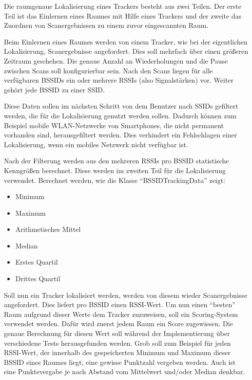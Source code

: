 Die raumgenaue Lokalisierung eines Trackers besteht aus zwei Teilen.
Der erste Teil ist das Einlernen eines Raumes mit Hilfe eines Trackers und der zweite das Zuordnen von Scanergebnissen
zu einem zuvor eingescannten Raum.

Beim Einlernen eines Raumes werden von einem Tracker, wie bei der eigentlichen Lokalisierung, Scanergebnisse angefordert.
Dies soll mehrfach über einen größeren Zeitraum geschehen.
Die genaue Anzahl an Wiederholungen und die Pause zwischen Scans soll konfigurierbar sein.
Nach den Scans liegen für alle verfügbaren \glspl{BSSID} ein oder mehrere \glspl{RSSI} (also Signalstärken) vor.
Weiter gehört jede \gls{BSSID} zu einer \gls{SSID}.

Diese Daten sollen im nächsten Schritt von dem Benutzer nach \glspl{SSID} gefiltert werden, die für die Lokalisierung
genutzt werden sollen.
Dadurch können zum Beispiel mobile \gls{WLAN}-Netzwerke von Smartphones, die nicht permanent vorhanden sind, herausgefiltert werden.
Dies verhindert ein Fehlschlagen einer Lokalisierung, wenn ein mobiles Netzwerk nicht verfügbar ist.

Nach der Filterung werden aus den mehreren \glspl{RSSI} pro \gls{BSSID} statistische Kenngrößen berechnet.
Diese werden im zweiten Teil für die Lokalisierung verwendet.
Berechnet werden, wie die Klasse \enquote{BSSIDTrackingData} zeigt:
\begin{itemize}
	\item Minimum
	\item Maximum
	\item Arithmetisches Mittel
	\item Median
	\item Erstes Quartil
	\item Drittes Quartil
\end{itemize}

Soll nun ein Tracker lokalisiert werden, werden von diesem wieder Scanergebnisse angefordert.
Dies liefert pro \gls{BSSID} einen \gls{RSSI}-Wert.
Um nun einen \enquote{besten} Raum aufgrund dieser Werte dem Tracker zuzuweisen, soll ein Scoring-System verwendet werden.
Dafür wird zuerst jedem Raum ein Score zugewiesen.
Die genaue Berechnung für diesen Wert soll während der Implementierung über verschiedene Tests herausgefunden werden.
Grob soll zum Beispiel für jeden \gls{RSSI}-Wert, der innerhalb des gespeicherten Minimum und Maximum dieser \gls{BSSID}
eines Raumes liegt, eine gewisse Punktzahl vergeben werden.
Auch ist eine Punktevergabe je nach Abstand vom Mittelwert und/oder Median denkbar.

